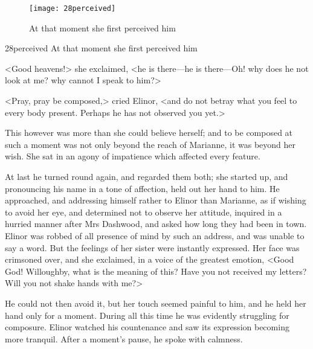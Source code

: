 \begin{a4}
	\begin{figure}[tbph]
		\centering
		\texttt{[image: 28perceived]}
		\caption{At that moment she first perceived him}
	\end{figure}	
\end{a4}

\begin{letter}
	\begin{bwbigpic}
	[1.0]
	{28perceived} 
	{At that moment she first perceived him} 
	\end{bwbigpic}
\end{letter}

<Good heavens!> she exclaimed, <he is there—he is there—Oh! why does he not look at me? why cannot I speak to him?>

<Pray, pray be composed,> cried Elinor, <and do not betray what you feel to every body present. Perhaps he has not observed you yet.>

This however was more than she could believe herself; and to be composed at such a moment was not only beyond the reach of Marianne, it was beyond her wish. She sat in an agony of impatience which affected every feature.

At last he turned round again, and regarded them both; she started up, and pronouncing his name in a tone of affection, held out her hand to him. He approached, and addressing himself rather to Elinor than Marianne, as if wishing to avoid her eye, and determined not to observe her attitude, inquired in a hurried manner after Mrs Dashwood, and asked how long they had been in town. Elinor was robbed of all presence of mind by such an address, and was unable to say a word. But the feelings of her sister were instantly expressed. Her face was crimsoned over, and she exclaimed, in a voice of the greatest emotion, <Good God! Willoughby, what is the meaning of this? Have you not received my letters? Will you not shake hands with me?>

He could not then avoid it, but her touch seemed painful to him, and he held her hand only for a moment. During all this time he was evidently struggling for composure. Elinor watched his countenance and saw its expression becoming more tranquil. After a moment's pause, he spoke with calmness.

